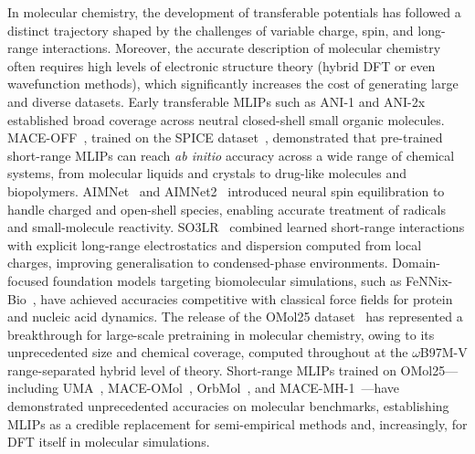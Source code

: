 \documentclass[aps,%
superscriptaddress,
 amsmath,amssymb,
floatfix,
twocolumn
]{revtex4-2}
\begin{document}
In molecular chemistry, the development of transferable potentials has followed a distinct trajectory shaped by the challenges of variable charge, spin, and long-range interactions. Moreover, the accurate description of molecular chemistry often requires high levels of electronic structure theory (hybrid DFT or even wavefunction methods), which significantly increases the cost of generating large and diverse datasets. Early transferable MLIPs such as ANI-1 and ANI-2x established broad coverage across neutral closed-shell small organic molecules.\cite{smith2017ani1,devereux2020ani2x,smith2020ani1x} MACE-OFF~\cite{kovacs2025maceoff}, trained on the SPICE dataset~\cite{eastman2022spicedatasetdruglikemolecules}, demonstrated that pre-trained short-range MLIPs can reach \textit{ab initio} accuracy across a wide range of chemical systems, from molecular liquids and crystals to drug-like molecules and biopolymers. AIMNet~\cite{aimnet2019} and AIMNet2~\cite{anstine2025aimnet2, Kalita2025} introduced neural spin equilibration to handle charged and open-shell species, enabling accurate treatment of radicals and small-molecule reactivity. SO3LR~\cite{kabylda2025so3lr} combined learned short-range interactions with explicit long-range electrostatics and dispersion computed from local charges, improving generalisation to condensed-phase environments. Domain-focused foundation models targeting biomolecular simulations, such as FeNNix-Bio~\cite{Pl__2023,PL_2025}, have achieved accuracies competitive with classical force fields for protein and nucleic acid dynamics. The release of the OMol25 dataset~\cite{levine2025openmolecules2025omol25} has represented a breakthrough for large-scale pretraining in molecular chemistry, owing to its unprecedented size and chemical coverage, computed throughout at the $\omega$B97M-V range-separated hybrid level of theory. Short-range MLIPs trained on OMol25---including UMA~\cite{wood2025umafamilyuniversalmodels}, MACE-OMol~\cite{levine2025openmolecules2025omol25}, OrbMol~\cite{rhodes2025orbv3atomisticsimulationscale}, and MACE-MH-1~\cite{batatia2025crosslearningelectronicstructure}---have demonstrated unprecedented accuracies on molecular benchmarks, establishing MLIPs as a credible replacement for semi-empirical methods and, increasingly, for DFT itself in molecular simulations.
\end{document}
